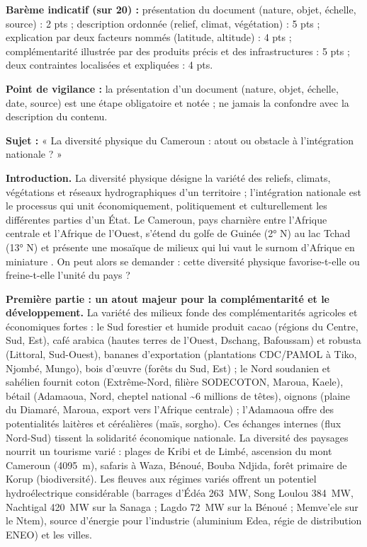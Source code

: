\documentclass[11pt]{article}
\begin{document}
\begin{corrige}
\begin{enumerate}
\end{enumerate}
\textbf{Barème indicatif (sur 20) :} présentation du document (nature, objet, échelle, source) : 2 pts ; description ordonnée (relief, climat, végétation) : 5 pts ; explication par deux facteurs nommés (latitude, altitude) : 4 pts ; complémentarité illustrée par des produits précis et des infrastructures : 5 pts ; deux contraintes localisées et expliquées : 4 pts.

\textbf{Point de vigilance :} la présentation d'un document (nature, objet, échelle, date, source) est une étape obligatoire et notée ; ne jamais la confondre avec la description du contenu.
\end{corrige}

\begin{corrige}
\textbf{Sujet :} « La diversité physique du Cameroun : atout ou obstacle à l'intégration nationale ? »

\textbf{Introduction.} La diversité physique désigne la variété des reliefs, climats, végétations et réseaux hydrographiques d'un territoire ; l'intégration nationale est le processus qui unit économiquement, politiquement et culturellement les différentes parties d'un État. Le Cameroun, pays charnière entre l'Afrique centrale et l'Afrique de l'Ouest, s'étend du golfe de Guinée (2° N) au lac Tchad (13° N) et présente une mosaïque de milieux qui lui vaut le surnom d'\og Afrique en miniature \fg. On peut alors se demander : cette diversité physique favorise-t-elle ou freine-t-elle l'unité du pays ?

\textbf{Première partie : un atout majeur pour la complémentarité et le développement.}
La variété des milieux fonde des complémentarités agricoles et économiques fortes : le Sud forestier et humide produit cacao (régions du Centre, Sud, Est), café arabica (hautes terres de l'Ouest, Dschang, Bafoussam) et robusta (Littoral, Sud-Ouest), bananes d'exportation (plantations CDC/PAMOL à Tiko, Njombé, Mungo), bois d'œuvre (forêts du Sud, Est) ; le Nord soudanien et sahélien fournit coton (Extrême-Nord, filière SODECOTON, Maroua, Kaele), bétail (Adamaoua, Nord, cheptel national \textasciitilde 6 millions de têtes), oignons (plaine du Diamaré, Maroua, export vers l'Afrique centrale) ; l'Adamaoua offre des potentialités laitères et céréalières (maïs, sorgho). Ces échanges internes (flux Nord-Sud) tissent la solidarité économique nationale. La diversité des paysages nourrit un tourisme varié : plages de Kribi et de Limbé, ascension du mont Cameroun (\SI{4095}{m}), safaris à Waza, Bénoué, Bouba Ndjida, forêt primaire de Korup (biodiversité). Les fleuves aux régimes variés offrent un potentiel hydroélectrique considérable (barrages d'Édéa \SI{263}{MW}, Song Loulou \SI{384}{MW}, Nachtigal \SI{420}{MW} sur la Sanaga ; Lagdo \SI{72}{MW} sur la Bénoué ; Memve'ele sur le Ntem), source d'énergie pour l'industrie (aluminium Edea, régie de distribution ENEO) et les villes.


\end{corrige}
\end{document}
